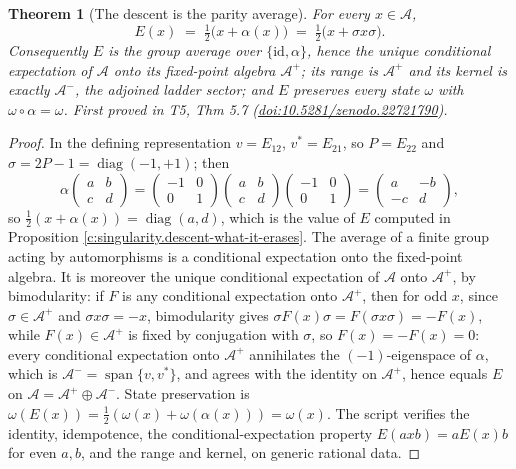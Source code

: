 \documentclass[11pt]{article}
\newtheorem{theorem}{Theorem}[section]
\theoremstyle{definition}
\theoremstyle{plain}
\providecommand{\Aa}{}\renewcommand{\Aa}{\mathcal{A}}
\providecommand{\Aev}{}\renewcommand{\Aev}{\mathcal{A}^{+}}
\providecommand{\Aod}{}\renewcommand{\Aod}{\mathcal{A}^{-}}
\providecommand{\id}{}\renewcommand{\id}{\mathrm{id}}
\begin{document}
\begin{theorem}[The descent is the parity average]\label{c:singularity.descent-parity-average}
For every $x \in \Aa$,
\[
E(x) \;=\; \tfrac12\bigl(x + \alpha(x)\bigr) \;=\; \tfrac12\bigl(x + \sigma x \sigma\bigr) .
\]
Consequently $E$ is the group average over $\{\id, \alpha\}$, hence the unique conditional expectation of $\Aa$ onto its fixed-point algebra $\Aev$; its range is $\Aev$ and its kernel is exactly $\Aod$, the adjoined ladder sector; and $E$ preserves every state $\omega$ with $\omega \circ \alpha = \omega$.
\emph{First proved in} T5, Thm 5.7 (\href{https://doi.org/10.5281/zenodo.22721790}{doi:10.5281/zenodo.22721790}).
\end{theorem}
\begin{proof}
In the defining representation $v = E_{12}$, $v^{*} = E_{21}$, so $P = E_{22}$ and $\sigma = 2P - 1 = \operatorname{diag}(-1, +1)$; then
\[
\alpha\begin{pmatrix} a & b \\ c & d \end{pmatrix}
= \begin{pmatrix} -1 & 0 \\ 0 & 1\end{pmatrix}\begin{pmatrix} a & b \\ c & d \end{pmatrix}\begin{pmatrix} -1 & 0 \\ 0 & 1\end{pmatrix}
= \begin{pmatrix} a & -b \\ -c & d \end{pmatrix},
\]
so $\tfrac12(x + \alpha(x)) = \operatorname{diag}(a,d)$, which is the value of $E$ computed in Proposition \ref{c:singularity.descent-what-it-erases}. The average of a finite group acting by automorphisms is a conditional expectation onto the fixed-point algebra. It is moreover the unique conditional expectation of $\Aa$ onto $\Aev$, by bimodularity: if $F$ is any conditional expectation onto $\Aev$, then for odd $x$, since $\sigma \in \Aev$ and $\sigma x \sigma = -x$, bimodularity gives $\sigma F(x) \sigma = F(\sigma x \sigma) = -F(x)$, while $F(x) \in \Aev$ is fixed by conjugation with $\sigma$, so $F(x) = -F(x) = 0$: every conditional expectation onto $\Aev$ annihilates the $(-1)$-eigenspace of $\alpha$, which is $\Aod = \operatorname{span}\{v, v^{*}\}$, and agrees with the identity on $\Aev$, hence equals $E$ on $\Aa = \Aev \oplus \Aod$. State preservation is $\omega(E(x)) = \tfrac12(\omega(x) + \omega(\alpha(x))) = \omega(x)$. The script verifies the identity, idempotence, the conditional-expectation property $E(axb) = aE(x)b$ for even $a, b$, and the range and kernel, on generic rational data.

\end{proof}
\end{document}
